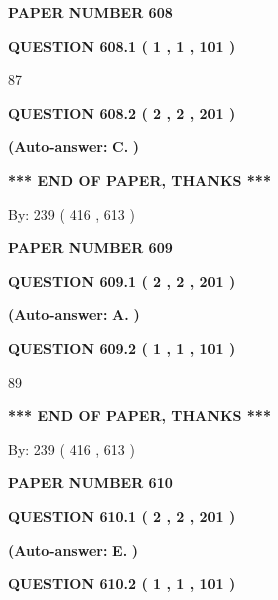 \documentclass{ctexart}
\begin{document}
   
 {\textbf{ \Large{ PAPER NUMBER  608  }}}
   
   
   
   
  
  
{\textbf{\large{QUESTION
608.1 
 ( 1 , 1 , 101 )
}}}

87
  
  
{\textbf{\large{QUESTION
608.2 
 ( 2 , 2 , 201 )
}}}
 
 
{\textbf{(Auto-answer:}}
{\textbf{\large{
C.}}}
{\textbf{)}}
 
 
   
   
   
   
\vspace{1.0in} 
{\textbf{\large{ *** END OF PAPER, THANKS *** }}} 
   
   
\hspace{1.0in} By: 
 239 ( 416 ,  613 )
   
   
   
   
\newpage 
\setcounter{page}{ 
   609001 } 
   
   
 {\textbf{ \Large{ PAPER NUMBER  609  }}}
   
   
   
   
  
  
{\textbf{\large{QUESTION
609.1 
 ( 2 , 2 , 201 )
}}}
 
 
{\textbf{(Auto-answer:}}
{\textbf{\large{
A.}}}
{\textbf{)}}
 
 
  
  
{\textbf{\large{QUESTION
609.2 
 ( 1 , 1 , 101 )
}}}

89
   
   
   
   
\vspace{1.0in} 
{\textbf{\large{ *** END OF PAPER, THANKS *** }}} 
   
   
\hspace{1.0in} By: 
 239 ( 416 ,  613 )
   
   
   
   
\newpage 
\setcounter{page}{ 
   610001 } 
   
   
 {\textbf{ \Large{ PAPER NUMBER  610  }}}
   
   
   
   
  
  
{\textbf{\large{QUESTION
610.1 
 ( 2 , 2 , 201 )
}}}
 
 
{\textbf{(Auto-answer:}}
{\textbf{\large{
E.}}}
{\textbf{)}}
 
 
  
  
{\textbf{\large{QUESTION
610.2 
 ( 1 , 1 , 101 )
}}}
\end{document}
